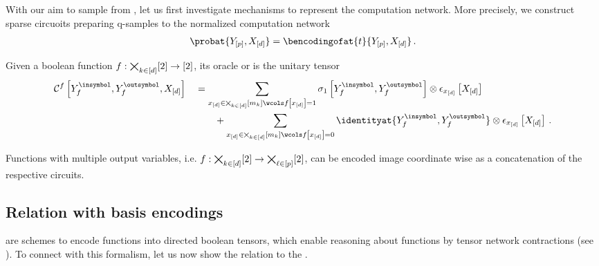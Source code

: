 \section{\ComputationCircuits{}}

With our aim to sample from \CompActNets{}, let us first investigate mechanisms to represent the computation network.
More precisely, we construct sparse circuoits preparing q-samples to the normalized computation network
\begin{align*}
    \probat{\headvariables,\shortcatvariables}
    = \bencodingofat{\sstat}{\headvariables,\shortcatvariables} \, .
\end{align*}

\begin{definition}[\ComputationCircuit{}]
    Given a boolean function $f:\bigtimes_{k\in[d]}[2]\rightarrow[2]$, its oracle or \computationCircuit{} is the unitary tensor
    \begin{align*}
        \qcbencodingofat{\exformula}{\cheadvariableof{\exformula}{\insymbol},\cheadvariableof{\exformula}{\outsymbol},\shortcatvariables}
        &\quad=
        \sum_{\shortcatindicesin\wcols\exformulaat{\shortcatindices}=1}
        \paulixat{\cheadvariableof{\exformula}{\insymbol},\cheadvariableof{\exformula}{\outsymbol}} \otimes
        \onehotmapofat{\shortcatindices}{\shortcatvariables} \\
        & \quad \quad \quad +
        \sum_{\shortcatindicesin\wcols\exformulaat{\shortcatindices}=0}
        \identityat{\cheadvariableof{\exformula}{\insymbol},\cheadvariableof{\exformula}{\outsymbol}} \otimes
        \onehotmapofat{\shortcatindices}{\shortcatvariables} \, .
    \end{align*}
\end{definition}



Functions with multiple output variables, i.e. $f:\bigtimes_{k\in[d]}[2]\rightarrow\bigtimes_{\ell\in[p]}[2]$, can be encoded image coordinate wise as a concatenation of the respective circuits.

\subsection{Relation with basis encodings}

\BasisEncodings{} are schemes to encode functions into directed boolean tensors, which enable reasoning about functions by tensor network contractions (see \cite{goessmann_tensor_2026}).
To connect with this formalism, let us now show the relation to the \computationCircuits{}.

